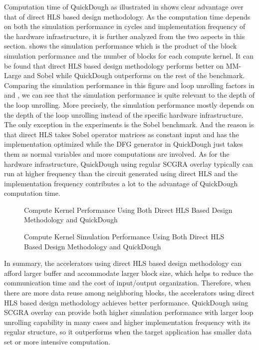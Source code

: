 Computation time of QuickDough as illustrated in  shows clear advantage over that of direct HLS based design methodology. As the computation time depends on both the simulation performance in cycles and implementation frequency of the hardware infrastructure, it is further analyzed from the two aspects in this section.  shows the simulation performance which is the product of the block simulation performance and the number of blocks for each compute kernel. It can be found that direct HLS based design methodology performs better on MM-Large and Sobel while QuickDough outperforms on the rest of the benchmark. Comparing the simulation performance in this figure and loop unrolling factors in  and , we can see that the simulation performance is quite relevant to the depth of the loop unrolling. More precisely, the simulation performance mostly depends on the depth of the loop unrolling instead of the specific hardware infrastructure. The only exception in the experiments is the Sobel benchmark. And the reason is that direct HLS takes Sobel operator matrices as constant input and has the implementation optimized while the DFG generator in QuickDough just takes them as normal variables and more computations are involved. As for the hardware infrastructure, QuickDough using regular SCGRA overlay typically can run at higher frequency than the circuit generated using direct HLS and the implementation frequency contributes a lot to the advantage of QuickDough computation time. 

\begin{figure}[htpb]
\caption{Compute Kernel Performance Using Both Direct HLS Based Design Methodology and QuickDough}
\label{fig:kernel-real-perf}
\end{figure}

\begin{figure}[htpb]
\caption{Compute Kernel Simulation Performance Using Both Direct HLS Based Design Methodology and QuickDough}
\label{fig:kernel-sim-perf}
\end{figure}

In summary, the accelerators using direct HLS based design methodology can afford larger buffer and accommodate larger block size, which helps to reduce the communication time and the cost of input/output organization. Therefore, when there are more data reuse among neighboring blocks, the accelerators using direct HLS based design methodology achieves better performance. QuickDough using SCGRA overlay can provide both higher simulation performance with larger loop unrolling capability in many cases and higher implementation frequency with its regular structure, so it outperforms when the target application has smaller data set or more intensive computation.  

